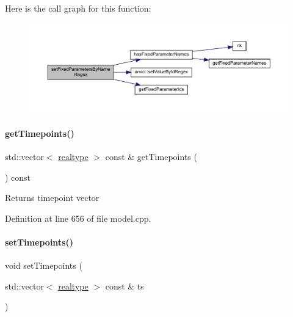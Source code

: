 Here is the call graph for this function\+:
\nopagebreak
\begin{figure}[H]
\begin{center}
\leavevmode
\includegraphics[width=350pt]{classamici_1_1_model_a4802f7d56264e3b592c167da8166cb73_cgraph}
\end{center}
\end{figure}
\mbox{\label{classamici_1_1_model_a50ea5198d117f8f4ad1e34bb279975c8}} 
\paragraph{\texorpdfstring{getTimepoints()}{getTimepoints()}}
{\footnotesize\ttfamily std\+::vector$<$ \mbox{\hyperlink{namespaceamici_a1bdce28051d6a53868f7ccbf5f2c14a3}{realtype}} $>$ const  \& get\+Timepoints (\begin{DoxyParamCaption}{ }\end{DoxyParamCaption}) const}

\begin{DoxyReturn}{Returns}
timepoint vector 
\end{DoxyReturn}


Definition at line 656 of file model.\+cpp.

\mbox{\label{classamici_1_1_model_a50f9642f9bcb883dbd3925c85abc4c24}} 
\paragraph{\texorpdfstring{setTimepoints()}{setTimepoints()}}
{\footnotesize\ttfamily void set\+Timepoints (\begin{DoxyParamCaption}\item[{std\+::vector$<$ \mbox{\hyperlink{namespaceamici_a1bdce28051d6a53868f7ccbf5f2c14a3}{realtype}} $>$ const \&}]{ts }\end{DoxyParamCaption})}


